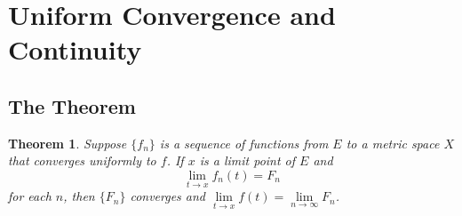 \documentclass[11pt]{article}
\newtheorem{theorem}{Theorem}
\begin{document}

\section{Uniform Convergence and Continuity}


\subsection{The Theorem}

\begin{theorem}
  Suppose $\{ f_{n} \}$ is a sequence of functions from $E$ to a metric space $X$ that converges uniformly to $f$. If $x$ is a limit point of $E$ and 
  \[
    \lim\limits_{t \to x} f_{n}(t) = F_{n}
  \]
  for each $n$, then $\{ F_{n} \}$ converges and $\lim\limits_{t \to x} f(t) = \lim\limits_{n \to \infty} F_{n}$.
\end{theorem}
\end{document}
